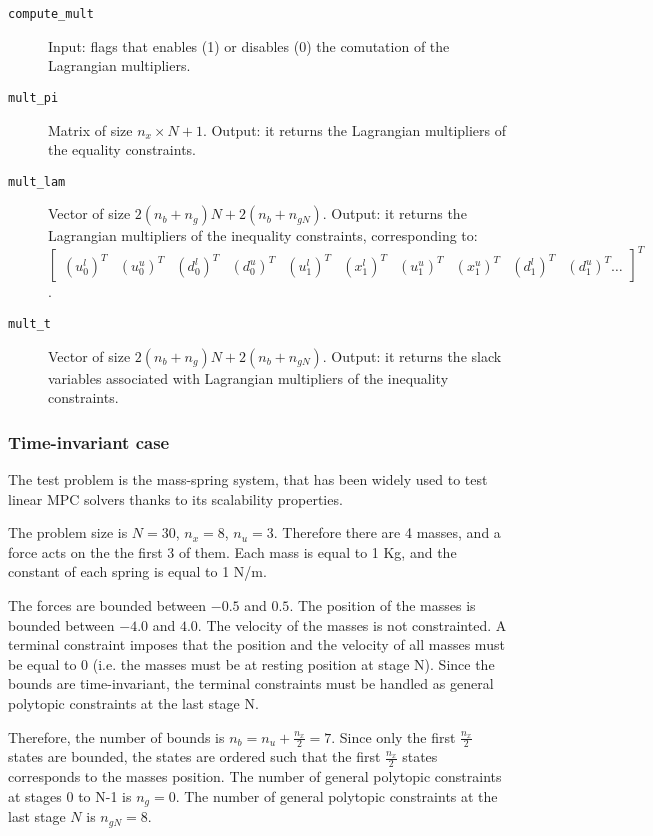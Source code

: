 \documentclass[a4paper]{report}
\begin{document}
\begin{description}
\item[\tt compute\_mult] Input: flags that enables (1) or disables (0) the comutation of the Lagrangian multipliers.

\item[\tt mult\_pi] Matrix of size $n_x \times N+1$.
Output: it returns the Lagrangian multipliers of the equality constraints.

\item[\tt mult\_lam] Vector of size $2(n_b+n_g)N + 2(n_b+n_{gN})$.
Output: it returns the Lagrangian multipliers of the inequality constraints, corresponding to: \\
$\begin{bmatrix} (u^l_0)^T & (u^u_0)^T & (d^l_0)^T & (d^u_0)^T & (u^l_1)^T & (x^l_1)^T & (u^u_1)^T & (x^u_1)^T & (d^l_1)^T & (d^u_1)^T \ldots \end{bmatrix}^T  $.

\item[\tt mult\_t] Vector of size $2(n_b+n_g)N + 2(n_b+n_{gN})$.
Output: it returns the slack variables associated with Lagrangian multipliers of the inequality constraints.

\end{description}


\subsubsection{Time-invariant case}

The test problem is the mass-spring system, that has been widely used to test linear MPC solvers thanks to its scalability properties.

The problem size is $N=30$, $n_x=8$, $n_u=3$.
Therefore there are 4 masses, and a force acts on the the first 3 of them.
Each mass is equal to 1 Kg, and the constant of each spring is equal to 1 N/m.

The forces are bounded between $-0.5$ and $0.5$.
The position of the masses is bounded between $-4.0$ and $4.0$.
The velocity of the masses is not constrainted.
A terminal constraint imposes that the position and the velocity of all masses must be equal to 0 (i.e. the masses must be at resting position at stage N).
Since the bounds are time-invariant, the terminal constraints must be handled as general polytopic constraints at the last stage N.

Therefore, the number of bounds is $n_b=n_u+\tfrac{n_x} 2 = 7$.
Since only the first $\tfrac{n_x} 2$ states are bounded, the states are ordered such that the first $\tfrac{n_x} 2$ states corresponds to the masses position.
The number of general polytopic constraints at stages 0 to N-1 is $n_g = 0$.
The number of general polytopic constraints at the last stage $N$ is $n_{gN} = 8$.
\end{document}
